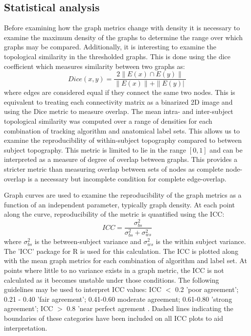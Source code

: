 \documentclass{frontiersSCNS} %
\newcommand{\R}{R}
\begin{document}
\subsection{Statistical analysis}
Before examining how the graph metrics change with density it is necessary to examine the maximum density of the graphs to determine the range over which graphs may be compared. Additionally, it is interesting to examine the topological similarity in the thresholded graphs. This is done using the dice coefficient which measures similarity between two graphs as:
$$Dice(x,y) = \frac{ 2 \| E(x) \cap E(y) \| }{ \|E(x) \| + \| E(y) |\ }$$
where edges are considered equal if they connect the same two
nodes. This is equivalent to treating each connectivity matrix as
a binarized 2D image and using the Dice metric to measure overlap. The mean intra- and inter-subject topological similarity 
was computed over a range of densities for each combination of tracking algorithm and anatomical label sets. This allows us to 
examine the reproducibility of within-subject topography compared to between subject topography. This metric is limited to lie in the range $[0,1]$ and can be interpreted as a measure of degree of overlap between graphs. This provides a stricter metric than measuring overlap between sets of nodes as complete node-overlap is a necessary but incomplete condition for complete edge-overlap.

Graph curves are used to examine the reproducibility of the graph metrics as a function of an independent parameter, typically graph density. At each point along the curve, reproducibility of the metric is quantified using the ICC:
$$ICC = \frac{\sigma_{bs}^{2}}{\sigma_{bs}^{2} + \sigma_{ws}^{2}} $$
where $\sigma_{bs}^{2}$ is the between-subject variance and $\sigma_{ws}^{2}$ is the within subject variance. The 'ICC' package for  \R{} is used for this calculation. The ICC is plotted along with the mean graph metrics for each combination of algorithm and label set. At points where little to no variance exists in a graph metric, the ICC is not calculated as it becomes unstable under those conditions. The following guidelines may be used to interpret ICC values: ICC $<$ 0.2 'poor agreement'; 0.21 - 0.40 'fair agreement'; 0.41-0.60 moderate agreement; 0.61-0.80 'strong agreement'; ICC $>$ 0.8 'near perfect agrement \citep{Telesford2010,Montgomery2002}. Dashed lines indicating the boundaries of these categories have been included on all ICC plots to aid interpretation.
\end{document}
